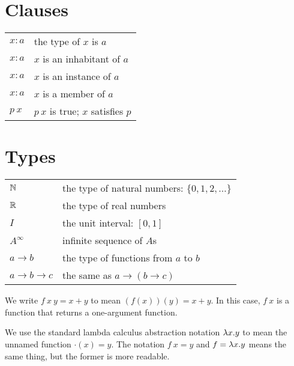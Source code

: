 \section{Clauses}

\begin{center}
    \begin{tabular}{ll}
        \(x : a\) & the type of \(x\) is \(a\)
        \\
        \(x : a\) & \(x\) is an inhabitant of \(a\)
        \\
        \(x : a\) & \(x\) is an instance of \(a\)
        \\
        \(x : a\) & \(x\) is a member of \(a\)
        \\
        \(p~x\) & \(p~x\) is true; \(x\) satisfies \(p\)
    \end{tabular}
\end{center}

\section{Types}

\begin{center}
    \begin{tabular}{ll}
        \(\mathbb{N}\) & the type of natural numbers: \(\{ 0, 1, 2, \ldots \}\)
        \\
        \(\mathbb{R}\) & the type of real numbers
        \\
        \(I\) & the unit interval: \([0,1]\)
        \\
        \(A^\infty\) & infinite sequence of \(A\)s
        \\
        \(a \to b\) & the type of functions from \(a\) to \(b\)
        \\
        \(a \to b \to c\) & the same as \(a \to (b \to c)\)
    \end{tabular}
\end{center}

We write \(f~x~y = x+y\) to mean \((f(x))(y) = x+y\).
In this case, \(f~x\) is a function that returns a one-argument function.

We use the standard lambda calculus abstraction notation
\(\lambda x. y\) to mean the unnamed function \(\cdot(x) = y\).
The notation \(f~x = y\) and \(f = \lambda x. y\) means the same thing,
but the former is more readable.
